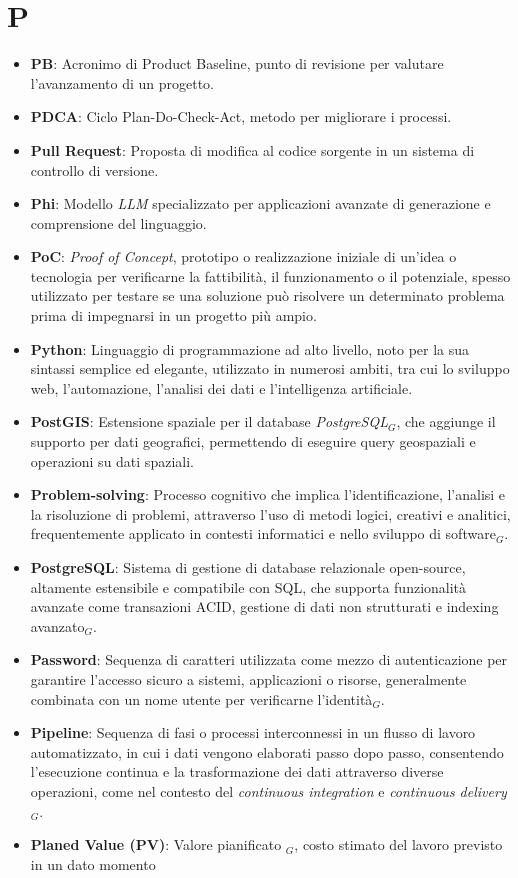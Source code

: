 \section{P}
\begin{itemize}
    \item \textbf{PB}: Acronimo di Product Baseline, punto di revisione per valutare l'avanzamento di un progetto.
    \item \textbf{PDCA}: Ciclo Plan-Do-Check-Act, metodo per migliorare i processi.
    \item \textbf{Pull Request}: Proposta di modifica al codice sorgente in un sistema di controllo di versione.
    \item \textbf{Phi}: Modello \textit{LLM} specializzato per applicazioni avanzate di generazione e comprensione del linguaggio.
    \item \textbf{PoC}: \textit{Proof of Concept}, prototipo o realizzazione iniziale di un'idea o tecnologia per verificarne la fattibilità, il funzionamento o il potenziale, spesso utilizzato per testare se una soluzione può risolvere un determinato problema prima di impegnarsi in un progetto più ampio.
    \item \textbf{Python}: Linguaggio di programmazione ad alto livello, noto per la sua sintassi semplice ed elegante, utilizzato in numerosi ambiti, tra cui lo sviluppo web, l'automazione, l'analisi dei dati e l'intelligenza artificiale.
    \item \textbf{PostGIS}: Estensione spaziale per il database \textit{PostgreSQL$_G$}, che aggiunge il supporto per dati geografici, permettendo di eseguire query geospaziali e operazioni su dati spaziali.
    \item \textbf{Problem-solving}: Processo cognitivo che implica l'identificazione, l'analisi e la risoluzione di problemi, attraverso l'uso di metodi logici, creativi e analitici, frequentemente applicato in contesti informatici e nello sviluppo di software$_G$.
    \item \textbf{PostgreSQL}: Sistema di gestione di database relazionale open-source, altamente estensibile e compatibile con SQL, che supporta funzionalità avanzate come transazioni ACID, gestione di dati non strutturati e indexing avanzato$_G$.
    \item \textbf{Password}: Sequenza di caratteri utilizzata come mezzo di autenticazione per garantire l'accesso sicuro a sistemi, applicazioni o risorse, generalmente combinata con un nome utente per verificarne l'identità$_G$.
    \item \textbf{Pipeline}: Sequenza di fasi o processi interconnessi in un flusso di lavoro automatizzato, in cui i dati vengono elaborati passo dopo passo, consentendo l'esecuzione continua e la trasformazione dei dati attraverso diverse operazioni, come nel contesto del \textit{continuous integration} e \textit{continuous delivery}$_G$.
    \item \textbf{Planed Value (PV)}: Valore pianificato $_G$, costo stimato del lavoro previsto in un dato momento
\end{itemize}
